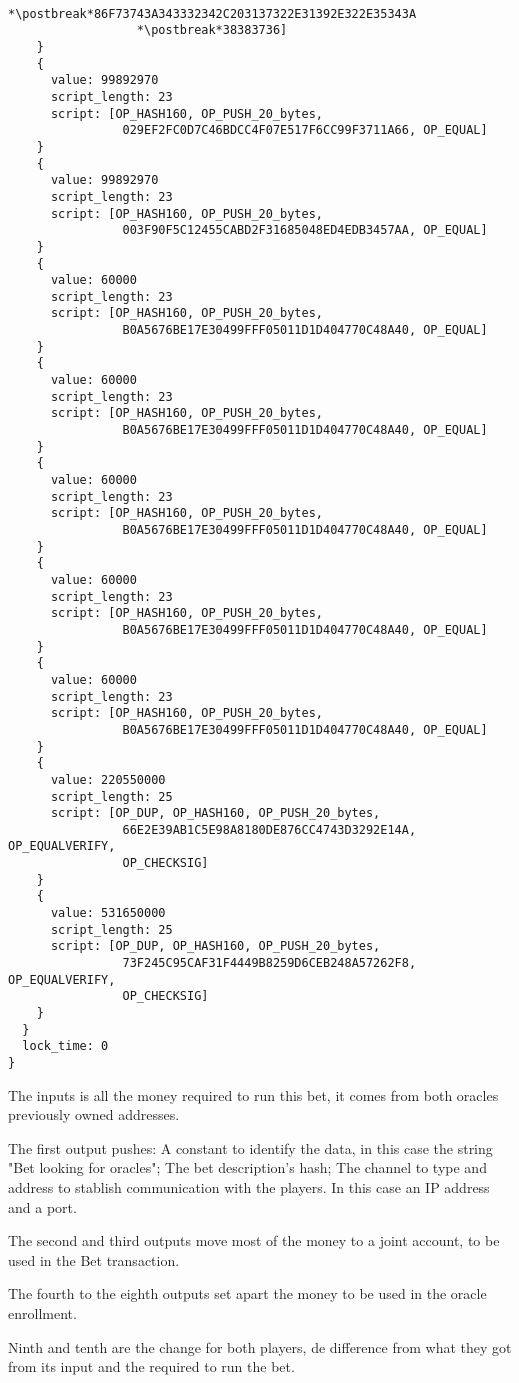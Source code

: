 \begin{lstlisting}
                  *\postbreak*86F73743A343332342C203137322E31392E322E35343A
                  *\postbreak*38383736]
    }
    {
      value: 99892970
      script_length: 23
      script: [OP_HASH160, OP_PUSH_20_bytes,
                029EF2FC0D7C46BDCC4F07E517F6CC99F3711A66, OP_EQUAL]
    }
    {
      value: 99892970
      script_length: 23
      script: [OP_HASH160, OP_PUSH_20_bytes,
                003F90F5C12455CABD2F31685048ED4EDB3457AA, OP_EQUAL]
    }
    {
      value: 60000
      script_length: 23
      script: [OP_HASH160, OP_PUSH_20_bytes,
                B0A5676BE17E30499FFF05011D1D404770C48A40, OP_EQUAL]
    }
    {
      value: 60000
      script_length: 23
      script: [OP_HASH160, OP_PUSH_20_bytes,
                B0A5676BE17E30499FFF05011D1D404770C48A40, OP_EQUAL]
    }
    {
      value: 60000
      script_length: 23
      script: [OP_HASH160, OP_PUSH_20_bytes,
                B0A5676BE17E30499FFF05011D1D404770C48A40, OP_EQUAL]
    }
    {
      value: 60000
      script_length: 23
      script: [OP_HASH160, OP_PUSH_20_bytes,
                B0A5676BE17E30499FFF05011D1D404770C48A40, OP_EQUAL]
    }
    {
      value: 60000
      script_length: 23
      script: [OP_HASH160, OP_PUSH_20_bytes,
                B0A5676BE17E30499FFF05011D1D404770C48A40, OP_EQUAL]
    }
    {
      value: 220550000
      script_length: 25
      script: [OP_DUP, OP_HASH160, OP_PUSH_20_bytes,
                66E2E39AB1C5E98A8180DE876CC4743D3292E14A, OP_EQUALVERIFY,
                OP_CHECKSIG]
    }
    {
      value: 531650000
      script_length: 25
      script: [OP_DUP, OP_HASH160, OP_PUSH_20_bytes,
                73F245C95CAF31F4449B8259D6CEB248A57262F8, OP_EQUALVERIFY,
                OP_CHECKSIG]
    }
  }
  lock_time: 0
}
\end{lstlisting}

The inputs is all the money required to run this bet, it comes from both
  oracles previously owned addresses.

The first output pushes: A constant to identify the data, in this case the
  string "Bet looking for oracles"; The bet description's hash; The channel
  to type and address to stablish communication with the players. In this
  case an IP address and a port.

The second and third outputs move most of the money to a joint account, to
  be used in the Bet transaction.

The fourth to the eighth outputs set apart the money to be used in the oracle
  enrollment.

Ninth and tenth are the change for both players, de difference from what they
  got from its input and the required to run the bet.

